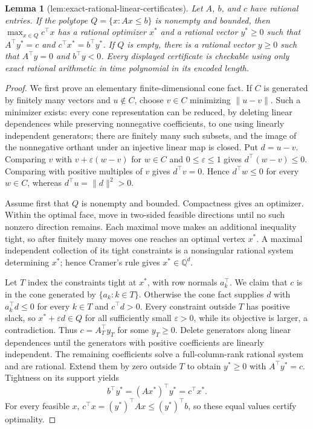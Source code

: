 \documentclass{article}
\newtheorem{lemma}{Lemma}
\begin{document}
\begin{lemma}[lem:exact-rational-linear-certificates]\label{lem:exact-rational-linear-certificates}
Let \(A\), \(b\), and \(c\) have rational entries. If the polytope \(Q=\{x:Ax\le b\}\) is nonempty and bounded, then \(\max_{x\in Q}c^\top x\) has a rational optimizer \(x^*\) and a rational vector \(y^*\ge0\) such that \(A^\top y^*=c\) and \(c^\top x^*=b^\top y^*\). If \(Q\) is empty, there is a rational vector \(y\ge0\) such that \(A^\top y=0\) and \(b^\top y<0\). Every displayed certificate is checkable using only exact rational arithmetic in time polynomial in its encoded length.
\end{lemma}
\begin{proof}
We first prove an elementary finite-dimensional cone fact. If \(C\) is generated by finitely many vectors and \(u\notin C\), choose \(v\in C\) minimizing \(\lVert u-v\rVert\). Such a minimizer exists: every cone representation can be reduced, by deleting linear dependences while preserving nonnegative coefficients, to one using linearly independent generators; there are finitely many such subsets, and the image of the nonnegative orthant under an injective linear map is closed. Put \(d=u-v\). Comparing \(v\) with \(v+\varepsilon(w-v)\) for \(w\in C\) and \(0\le\varepsilon\le1\) gives \(d^\top(w-v)\le0\). Comparing with positive multiples of \(v\) gives \(d^\top v=0\). Hence \(d^\top w\le0\) for every \(w\in C\), whereas \(d^\top u=\lVert d\rVert^2>0\).

Assume first that \(Q\) is nonempty and bounded. Compactness gives an optimizer. Within the optimal face, move in two-sided feasible directions until no such nonzero direction remains. Each maximal move makes an additional inequality tight, so after finitely many moves one reaches an optimal vertex \(x^*\). A maximal independent collection of its tight constraints is a nonsingular rational system determining \(x^*\); hence Cramer's rule gives \(x^*\in\mathbb Q^d\).

Let \(T\) index the constraints tight at \(x^*\), with row normals \(a_k^\top\). We claim that \(c\) is in the cone generated by \(\{a_k:k\in T\}\). Otherwise the cone fact supplies \(d\) with \(a_k^\top d\le0\) for every \(k\in T\) and \(c^\top d>0\). Every constraint outside \(T\) has positive slack, so \(x^*+\varepsilon d\in Q\) for all sufficiently small \(\varepsilon>0\), while its objective is larger, a contradiction. Thus \(c=A_T^\top y_T\) for some \(y_T\ge0\). Delete generators along linear dependences until the generators with positive coefficients are linearly independent. The remaining coefficients solve a full-column-rank rational system and are rational. Extend them by zero outside \(T\) to obtain \(y^*\ge0\) with \(A^\top y^*=c\). Tightness on its support yields
\[b^\top y^*=(Ax^*)^\top y^*=c^\top x^*.\]
For every feasible \(x\), \(c^\top x=(y^*)^\top Ax\le(y^*)^\top b\), so these equal values certify optimality.


\end{proof}
\end{document}
